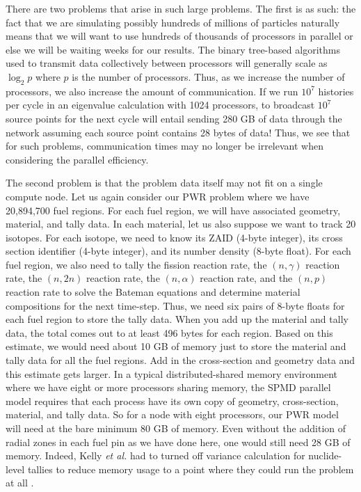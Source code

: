 \documentclass[11pt]{article}
\begin{document}
There are two problems that arise in such large problems. The first is
as such: the fact that we are simulating possibly hundreds of millions
of particles naturally means that we will want to use hundreds of
thousands of processors in parallel or else we will be waiting weeks
for our results. The binary tree-based algorithms used to transmit
data collectively between processors will generally scale as $\log_2
p$ where $p$ is the number of processors. Thus, as we increase the
number of processors, we also increase the amount of communication. If
we run $10^7$ histories per cycle in an eigenvalue calculation with
1024 processors, to broadcast $10^7$ source points for the next cycle
will entail sending 280 GB of data through the network assuming each
source point contains 28 bytes of data! Thus, we see that for such
problems, communication times may no longer be irrelevant when
considering the parallel efficiency.

The second problem is that the problem data itself may not fit on a
single compute node. Let us again consider our PWR problem where we
have 20,894,700 fuel regions. For each fuel region, we will have
associated geometry, material, and tally data. In each material, let
us also suppose we want to track 20 isotopes. For each isotope, we
need to know its ZAID (4-byte integer), its cross section identifier
(4-byte integer), and its number density (8-byte float). For each fuel
region, we also need to tally the fission reaction rate, the
$(n,\gamma)$ reaction rate, the $(n,2n)$ reaction rate, the
$(n,\alpha)$ reaction rate, and the $(n,p)$ reaction rate to solve the
Bateman equations and determine material compositions for the next
time-step. Thus, we need six pairs of 8-byte floats for each fuel
region to store the tally data. When you add up the material and tally
data, the total comes out to at least 496 bytes for each region. Based
on this estimate, we would need about 10 GB of memory just to store
the material and tally data for all the fuel regions. Add in the
cross-section and geometry data and this estimate gets larger. In a
typical distributed-shared memory environment where we have eight or
more processors sharing memory, the SPMD parallel model requires that
each process have its own copy of geometry, cross-section, material,
and tally data. So for a node with eight processors, our PWR model
will need at the bare minimum 80 GB of memory. Even without the
addition of radial zones in each fuel pin as we have done here, one
would still need 28 GB of memory. Indeed, Kelly {\em et al.} had to
turned off variance calculation for nuclide-level tallies to reduce
memory usage to a point where they could run the problem at all
\cite{kelly}.
\end{document}
